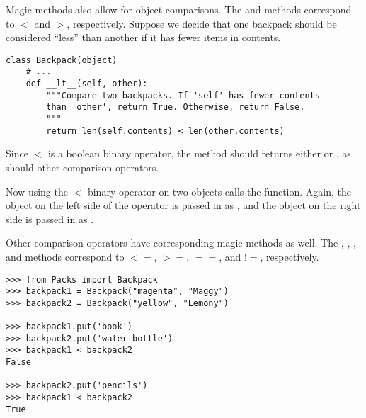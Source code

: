 Magic methods also allow for object comparisons.
The  and  methods correspond to $<$ and $>$, respectively.
Suppose we decide that one backpack should be considered ``less'' than another if it has fewer items in contents.

\begin{lstlisting}
class Backpack(object)
    # ...
    def __lt__(self, other):
        """Compare two backpacks. If 'self' has fewer contents
        than 'other', return True. Otherwise, return False.
        """
        return len(self.contents) < len(other.contents)
\end{lstlisting}


Since $<$ is a boolean binary operator, the  method should returns either  or , as should other comparison operators.

Now using the $<$ binary operator on two  objects calls the  function.
Again, the object on the left side of the operator is passed in as , and the object on the right side is passed in as .

Other comparison operators have corresponding magic methods as well.
The , , , and  methods correspond to $<=$, $>=$, $==$, and $!=$, respectively.

\begin{lstlisting}
>>> from Packs import Backpack
>>> backpack1 = Backpack("magenta", "Maggy")
>>> backpack2 = Backpack("yellow", "Lemony")

>>> backpack1.put('book')
>>> backpack2.put('water bottle')
>>> backpack1 < backpack2
False

>>> backpack2.put('pencils')
>>> backpack1 < backpack2
True
\end{lstlisting}

